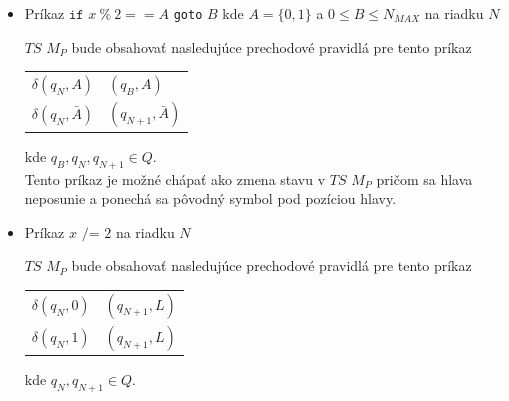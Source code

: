 \documentclass[11pt,a4paper]{article}
\begin{document}
\newpage
\begin{itemize}
    \item Príkaz $\texttt{if } x \ \% \ 2 == A$ \texttt{goto} $B$ kde $A = \{0, 1\}$ a $0 \leq B \leq N_{MAX}$ na riadku $N$\\[-1.5em]
        \begin{flushright}
        \begin{minipage}{0.90\textwidth}
            $TS$ $M_P$ bude obsahovať nasledujúce prechodové pravidlá pre tento príkaz
            \begin{center}
            \begin{tabular}{r@{ $=$ }l}
                $\delta(q_{N}, A)$       & $(q_{B}, A)$\\
                $\delta(q_{N}, \bar{A})$ & $(q_{N+1}, \bar{A})$
            \end{tabular}
            \end{center}
            kde $q_{B}, q_{N}, q_{N+1} \in Q$.\\

            Tento príkaz je možné chápať ako zmena stavu v $TS$ $M_P$ pričom sa hlava neposunie a ponechá sa pôvodný symbol pod pozíciou hlavy.
        \end{minipage}
        \end{flushright}
    \item Príkaz $x \texttt{ /= } 2$ na riadku $N$\\[-1.5em]
        \begin{flushright}
        \begin{minipage}{0.90\textwidth}
            $TS$ $M_P$ bude obsahovať nasledujúce prechodové pravidlá pre tento príkaz
            \begin{center}
            \begin{tabular}{r@{ $=$ }l}
                $\delta(q_{N}, 0)$ & $(q_{N+1}, L)$\\
                $\delta(q_{N}, 1)$ & $(q_{N+1}, L)$
            \end{tabular}
            \end{center}
            kde $q_{N}, q_{N+1} \in Q$.\\


\end{minipage}
\end{flushright}
\end{itemize}
\end{document}
